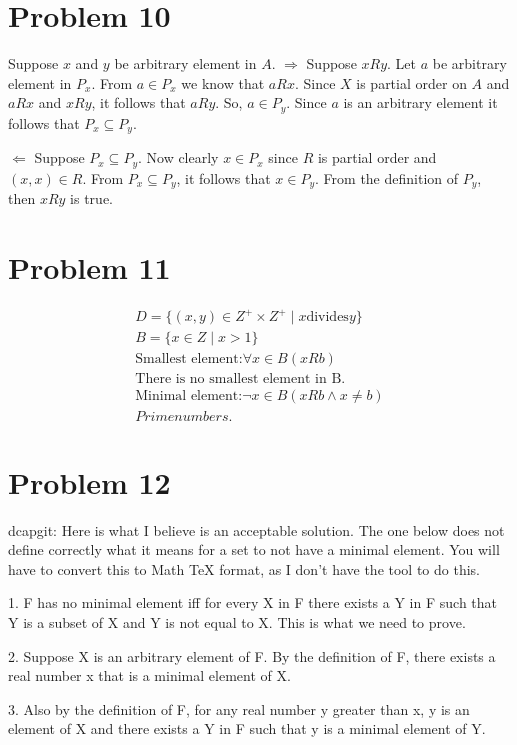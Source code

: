 \documentclass{article}
\begin{document}
\section{Problem 10}
Suppose $x$ and $y$ be arbitrary element in $A$.
$\Rightarrow$ Suppose $xRy$. Let $a$ be arbitrary element in $P_x$.
From $a \in P_x$ we know that $aRx$. Since $X$ is partial order on $A$
and $aRx$ and $xRy$, it follows that $aRy$. So, $a \in P_y$. Since $a$
is an arbitrary element it follows that $P_x \subseteq P_y$.

$\Leftarrow$ Suppose $P_x \subseteq P_y$. Now clearly $x \in P_x$
since $R$ is partial order and $(x,x) \in R$. From $P_x \subseteq
P_y$, it follows that $x \in P_y$. From the definition of $P_y$, then
$xRy$ is true.

\section{Problem 11}
\begin{align*}
  D = \{(x,y) \in Z^{+} \times Z^{+} \mid x \text{divides} y \} \\
  B = \{x \in Z \mid x > 1\} \\
  \text{Smallest element:} \forall x \in B(x R b) \\
  \text{There is no smallest element in B.} \\
  \text{Minimal element:} \neg x \in B(xRb \land x \neq b) \\
  Prime numbers.
\end{align*}

\section{Problem 12}
dcapgit: Here is what I believe is an acceptable solution. The one
         below does not define correctly what it means for a set to
         not have a minimal element. You will have to convert this to 
         Math TeX format, as I don't have the tool to do this.
         
1. F has no minimal element iff for every X in F there exists a Y in F such that Y is a subset of X and Y is not equal to X. This is what we need to prove.

2. Suppose X is an arbitrary element of F. By the definition of F, there exists a real number x that is a minimal element of X.

3. Also by the definition of F, for any real number y greater than x, y is an element of X and there exists a Y in F such that y is a minimal element of Y.
\end{document}
